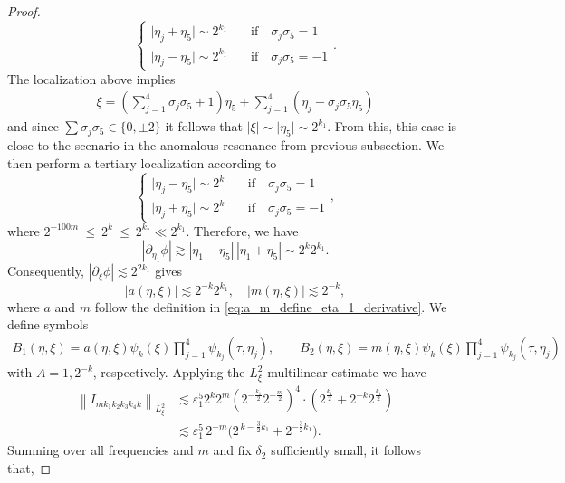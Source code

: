 \documentclass[reqno,english,11pt]{amsart}
\newcommand{\eps}{\varepsilon}
\newcommand{\snorm}[1]{\left\|#1\right\|}
\theoremstyle{definition}
\numberwithin{equation}{section}
\begin{document}
\begin{proof}
$$\begin{cases}
    \vert \eta_j+\eta_5\vert\sim 2^{k_1}\quad \;\;\;\text{if}\quad\sigma_j\sigma_5=1\\
    \vert \eta_j-\eta_5\vert\sim 2^{k_1}\quad \;\;\;\text{if}\quad\sigma_j\sigma_5=-1
\end{cases}
.
$$
The localization above implies 
\begin{align*}
    \xi=\left(\sum^4_{j=1}\sigma_j\sigma_5+1\right)\eta_5+\sum^4_{j=1}(\eta_j-\sigma_j\sigma_5\eta_5)
\end{align*}
and since $\sum \sigma_j\sigma_5\in\{0,\pm 2\}$ it follows that $\vert\xi\vert\sim\vert\eta_5\vert\sim2^{k_1}.$ From this, this case is close to the scenario in the anomalous resonance from previous subsection. We then perform a tertiary localization according to 
$$
\begin{cases}
    \vert \eta_j-\eta_5\vert\sim 2^{k}\quad \;\;\;\text{if}\quad\sigma_j\sigma_5=1\\
    \vert \eta_j+\eta_5\vert\sim 2^{k}\quad \;\;\;\text{if}\quad\sigma_j\sigma_5=-1
\end{cases}
,
$$
where $2^{-100m}\ \le\ 2^k\ \le\ 2^{k_*}\ll 2^{k_1}.$
Therefore, we have
$$\left|\partial_{\eta_1}\phi\right|\gtrsim \left|\eta_1-\eta_5\right|\,\left|\eta_1+\eta_5\right|\sim 2^k2^{k_1}.$$
Consequently, $|\partial_{\xi}\phi|\lesssim 2^{2k_1}$ gives
\begin{equation*}
    \left|a(\eta,\xi)\right| \lesssim 2^{-k}2^{k_1}, \quad \left|m(\eta,\xi)\right| \lesssim 2^{-k},
\end{equation*}
where $a$ and $m$ follow the definition in \eqref{eq:a_m_define_eta_1_derivative}. We define symbols
\begin{equation*}
    \begin{aligned}
B_1 (\eta,\xi) =a(\eta,\xi) \psi_{k}(\xi)\prod^4_{j=1} \psi_{k_j}\left(\tau,\eta_j\right),\qquad
B_2 (\eta,\xi) =m(\eta,\xi) \psi_{k}(\xi) \prod^4_{j=1} \psi_{k_j}\left(\tau,\eta_j\right)
\end{aligned}
\end{equation*}
with $A=1, 2^{-k}$, respectively.
Applying the $L^2_\xi$ multilinear estimate we have
\begin{align*}
    \snorm{I_{mk_1k_2k_3k_4k}}_{L^2_\xi}&\lesssim \eps_1^5 2^k 2^m \left(2^{-\frac{k_1}{2}}2^{-\frac{m}{2}}\right)^4\cdot \left(2^{\frac{k_1}{2}}+2^{-k}2^{\frac{k_1}{2}}\right)\\
    &\lesssim \eps_1^5\,2^{-m}\Big(2^{\,k-\frac{3}{2}k_1}+2^{-\frac{3}{2}k_1}\Big).
\end{align*}
Summing over all frequencies and $m$ and fix $\delta_2$ sufficiently small, it follows that,

\end{proof}
\end{document}
